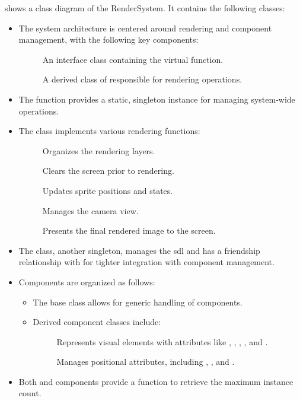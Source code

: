 \documentclass{projdoc}
\begin{document}
 shows a class diagram of the RenderSystem. It contains the
following classes:\noparbreak
\begin{itemize}
	\item The system architecture is centered around rendering and component
		management, with the following key components:\noparbreak
		\begin{description}
			\item[] An interface class containing the virtual
				 function.
			\item[] A derived class of 
				responsible for rendering operations.
		\end{description}
	\item The  function provides a static, singleton
		instance for managing system-wide operations.
	\item The  class implements various rendering
		functions:\noparbreak
		\begin{description}
			\item[] Organizes the rendering layers.
			\item[] Clears the screen prior to rendering.
			\item[] Updates sprite positions and states.
			\item[] Manages the camera view.
			\item[] Presents the final rendered image to the
				screen.
		\end{description}
	\item The  class, another singleton, manages the \gls{sdl}
		and has a friendship relationship with  for tighter
		integration with component management.
	\item Components are organized as follows:\noparbreak
		\begin{itemize}
			\item The  base class allows for generic handling of
				components.
			\item Derived component classes include:\noparbreak
				\begin{description}
					\item[] Represents visual elements with attributes like
						, , ,
						, and .
					\item[] Manages positional attributes, including
						, , and .
				\end{description}
		\end{itemize}
	\item Both  and  components provide a
		 function to retrieve the maximum instance count.
\end{itemize}
\end{document}
